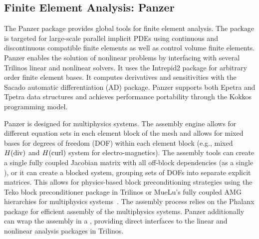 \subsection{Finite Element Analysis: Panzer}
The Panzer package provides global tools for finite element analysis. The package is targeted for large-scale parallel implicit PDEs using continuous and discontinuous compatible finite elements as well as control volume finite elements. Panzer enables the solution of nonlinear problems by interfacing with several Trilinos linear and nonlinear solvers. It uses the Intrepid2 package for arbitrary order finite element bases. It computes derivatives and sensitivities with the Sacado automatic differentiation (AD) package. Panzer supports both Epetra and Tpetra data structures and achieves performance portability through the Kokkos programming model.

Panzer is designed for multiphysics systems.
The assembly engine allows for different equation sets in each element block of the mesh and allows for mixed bases for degrees of freedom (DOF) within each element block
(e.g., mixed $H(\rm{div})$ and $H(\rm{curl})$ system for electro-magnetics).
The assembly tools can create a single fully coupled Jacobian matrix with all off-block dependencies (as a single ),
or it can create a blocked system, grouping sets of DOFs into separate explicit matrices.
This allows for physics-based block preconditioning strategies using the Teko block preconditioner package in Trilinos \cite{Bonilla2023,Cyr2016a}
or MueLu's fully coupled AMG hierarchies for multiphysics systems~\cite{Ohm2022a}.
The assembly process relies on the Phalanx package for efficient assembly of the multiphysics systems.
Panzer additionally can wrap the assembly in a , providing direct interfaces to the linear and nonlinear analysis packages in Trilinos.

